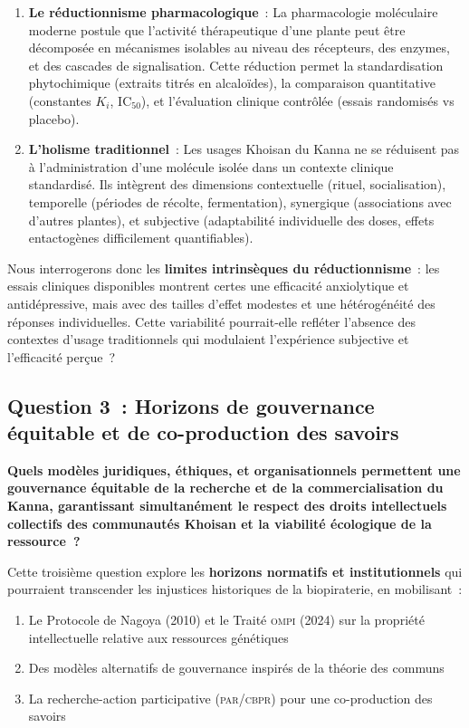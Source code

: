 \documentclass[12pt,a4paper,twoside]{book}
\begin{document}
\begin{enumerate}
\item \textbf{Le réductionnisme pharmacologique}~: La pharmacologie moléculaire moderne postule que l'activité thérapeutique d'une plante peut être décomposée en mécanismes isolables au niveau des récepteurs, des enzymes, et des cascades de signalisation. Cette réduction permet la standardisation phytochimique (extraits titrés en alcaloïdes), la comparaison quantitative (constantes $K_i$, $\mathrm{IC}_{50}$), et l'évaluation clinique contrôlée (essais randomisés vs placebo).

\item \textbf{L'holisme traditionnel}~: Les usages Khoisan du Kanna ne se réduisent pas à l'administration d'une molécule isolée dans un contexte clinique standardisé. Ils intègrent des dimensions contextuelle (rituel, socialisation), temporelle (périodes de récolte, fermentation), synergique (associations avec d'autres plantes), et subjective (adaptabilité individuelle des doses, effets entactogènes difficilement quantifiables).
\end{enumerate}

Nous interrogerons donc les \textbf{limites intrinsèques du réductionnisme}~: les essais cliniques disponibles montrent certes une efficacité anxiolytique et antidépressive, mais avec des tailles d'effet modestes et une hétérogénéité des réponses individuelles. Cette variabilité pourrait-elle refléter l'absence des contextes d'usage traditionnels qui modulaient l'expérience subjective et l'efficacité perçue~?

\subsection{Question 3~: Horizons de gouvernance équitable et de co-production des savoirs}

\textbf{Quels modèles juridiques, éthiques, et organisationnels permettent une gouvernance équitable de la recherche et de la commercialisation du Kanna, garantissant simultanément le respect des droits intellectuels collectifs des communautés Khoisan et la viabilité écologique de la ressource~?}

Cette troisième question explore les \textbf{horizons normatifs et institutionnels} qui pourraient transcender les injustices historiques de la biopiraterie, en mobilisant~:

\begin{enumerate}
\item Le Protocole de Nagoya (2010) et le Traité \textsc{ompi} (2024) sur la propriété intellectuelle relative aux ressources génétiques
\item Des modèles alternatifs de gouvernance inspirés de la théorie des communs \parencite{ostrom1990,hess2007}
\item La recherche-action participative (\textsc{par}/\textsc{cbpr}) pour une co-production des savoirs
\end{enumerate}
\end{document}
